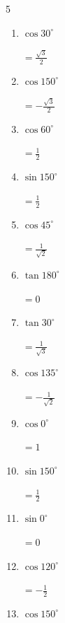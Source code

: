 \begin{multicols}{5}
\begin{enumerate}
        $\displaystyle =-1$

  \item $\displaystyle \cos{30^\circ}$

        $\displaystyle =\frac{\sqrt{3}}{2}$

  \item $\displaystyle \cos{150^\circ}$

        $\displaystyle =-\frac{\sqrt{3}}{2}$

  \item $\displaystyle \cos{60^\circ}$

        $\displaystyle =\frac{1}{2}$

  \item $\displaystyle \sin{150^\circ}$

        $\displaystyle =\frac{1}{2}$

  \item $\displaystyle \cos{45^\circ}$

        $\displaystyle =\frac{1}{\sqrt{2}}$

\columnbreak %

  \item $\displaystyle \tan{180^\circ}$

        $\displaystyle =0$

  \item $\displaystyle \tan{30^\circ}$

        $\displaystyle =\frac{1}{\sqrt{3}}$

  \item $\displaystyle \cos{135^\circ}$

        $\displaystyle =-\frac{1}{\sqrt{2}}$

  \item $\displaystyle \cos{0^\circ}$

        $\displaystyle =1$

  \item $\displaystyle \sin{150^\circ}$

        $\displaystyle =\frac{1}{2}$

  \item $\displaystyle \sin{0^\circ}$

        $\displaystyle =0$

  \item $\displaystyle \cos{120^\circ}$

        $\displaystyle =-\frac{1}{2}$

  \item $\displaystyle \cos{150^\circ}$


\end{enumerate}
\end{multicols}
